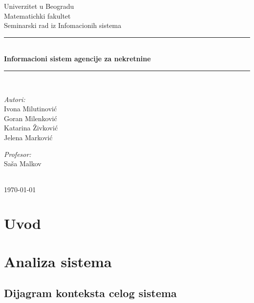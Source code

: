 \documentclass{article}
\begin{document}
\begin{titlepage}

\newcommand{\HRule}{\rule{\linewidth}{0.5mm}}
\center
\textup{\Large Univerzitet u Beogradu\\Matematichki fakultet}\\[1.5cm]
\textup{\Large Seminarski rad iz Infomacionih sistema}\\[0.4cm]

\HRule \\[0.4cm]
{ \huge \bfseries Informacioni sistem agencije za nekretnine}\\[0.4cm]
\HRule \\[8.5cm]

\begin{minipage}{0.4\textwidth}
\begin{flushleft}
\large
\emph{Autori:}\\
\textup Ivona Milutinovi\' c\\
\textup Goran Milenkovi\' c\\
\textup Katarina \v Zivkovi\' c\\
\textup Jelena Markovi\' c

\end{flushleft}
\end{minipage}
\hfill
\begin{minipage}{0.4\textwidth}
\begin{flushright}
\large
\emph{Profesor:} \\
\textup Sa\v sa Malkov\\
\end{flushright}
\end{minipage}\\[2cm]


{\textup \large \today}\\[1cm]

\end{titlepage}

\newpage
\tableofcontents

\newpage
\section{\bfseries Uvod}

\newpage
\section{\bfseries Analiza sistema}

\newpage
\subsection{\bfseries Dijagram konteksta celog sistema}
\end{document}
